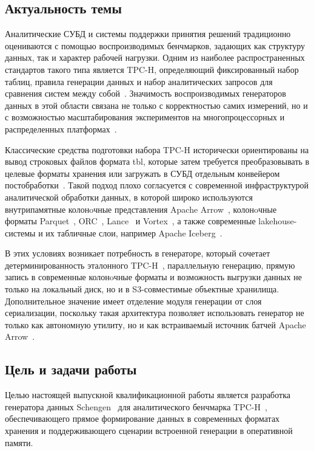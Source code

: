 \subsection*{Актуальность темы}

Аналитические СУБД и системы поддержки принятия решений традиционно оцениваются
с помощью воспроизводимых бенчмарков, задающих как структуру данных, так и
характер рабочей нагрузки. Одним из наиболее распространенных стандартов такого
типа является TPC-H, определяющий фиксированный набор таблиц, правила
генерации данных и набор аналитических запросов для сравнения систем между
собой~\cite{tpch-spec}. Значимость воспроизводимых генераторов данных в этой
области связана не только с корректностью самих измерений, но и с возможностью
масштабирования экспериментов на многопроцессорных и распределенных
платформах~\cite{dewitt-gray}.

Классические средства подготовки набора TPC-H исторически ориентированы на
вывод строковых файлов формата tbl, которые затем требуется преобразовывать в
целевые форматы хранения или загружать в СУБД отдельным конвейером
постобработки~\cite{dbgen-mirror}. Такой подход плохо согласуется с современной
инфраструктурой аналитической обработки данных, в которой широко используются
внутрипамятные колонoчные представления Apache Arrow~\cite{apache-arrow},
колонoчные форматы Parquet~\cite{apache-parquet},
ORC~\cite{apache-orc}, Lance~\cite{lance-format} и
Vortex~\cite{vortex-format}, а также современные lakehouse-системы и
их табличные слои, например Apache Iceberg~\cite{apache-iceberg}.

В этих условиях возникает потребность в генераторе, который сочетает
детерминированность эталонного TPC-H~\cite{tpch-spec}, параллельную генерацию,
прямую запись в современные колонoчные форматы и возможность выгрузки данных не
только на локальный диск, но и в S3-совместимые объектные хранилища.
Дополнительное значение имеет отделение модуля генерации от слоя сериализации,
поскольку такая архитектура позволяет использовать генератор не только как
автономную утилиту, но и как встраиваемый источник батчей
Apache Arrow~\cite{apache-arrow}.

\subsection*{Цель и задачи работы}

Целью настоящей выпускной квалификационной работы является разработка генератора
данных Schengen~\cite{schengen-repo} для аналитического бенчмарка
TPC-H~\cite{tpch-spec},
обеспечивающего прямое формирование данных в современных форматах хранения и
поддерживающего сценарии встроенной генерации в оперативной памяти.

